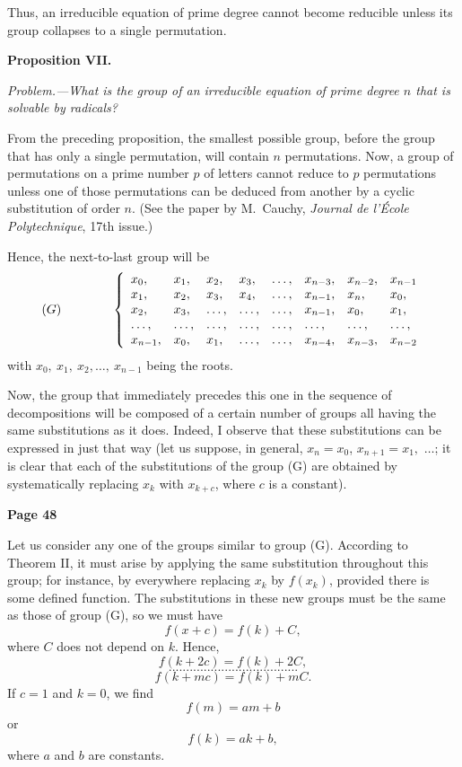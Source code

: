 \documentclass{article}
\begin{document}
Thus, an irreducible equation of prime degree cannot become reducible unless its group collapses to a single permutation.

\textbf{Proposition VII.}

\emph{Problem.---What is the group of an irreducible equation of prime degree $n$ that is solvable by radicals?}

From the preceding proposition, the smallest possible group, before the group that has only a single permutation, will contain $n$ permutations. Now, a group of permutations on a prime number $p$ of letters cannot reduce to $p$ permutations unless one of those permutations can be deduced from another by a cyclic substitution of order $n.$ (See the paper by M.\ Cauchy, \emph{Journal de l'École Polytechnique}, 17th issue.)

Hence, the next-to-last group will be
\[
(G)\quad\quad\quad\quad \left\{
\begin{array}{l l l l l l l l}
x_0, & x_1, & x_2, & x_3, & \dots, & x_{n-3}, & x_{n-2}, & x_{n-1} \\
x_1, & x_2, & x_3, & x_4, & \dots, & x_{n-1}, & x_n, & x_0, \\
x_2, & x_3, & \dots, &  \dots, &  \dots, & x_{n-1}, & x_0, & x_1, \\
\dots, & \dots, & \dots, & \dots, & \dots, & \dots, & \dots, & \dots, \\
x_{n-1}, & x_0, & x_{1}, & \dots, & \dots, & x_{n-4}, & x_{n-3}, & x_{n-2}
\end{array}
\right.
\]
with $x_0,\ x_1,\ x_2,\dots,\ x_{n-1}$ being the roots.

Now, the group that immediately precedes this one in the sequence of decompositions will be composed of a certain number of groups all having the same substitutions as it does. Indeed, I observe that these substitutions can be expressed in just that way (let us suppose, in general, $x_n=x_0$, $x_{n+1}=x_1,$ $\dots$; it is clear that each of the substitutions of the group (G) are obtained by systematically replacing $x_k$ with $x_{k + c}$, where $c$ is a constant).

\bigskip

\textbf{Page 48}

Let us consider any one of the groups similar to group (G). According to Theorem II, it must arise by applying the same substitution throughout this group; for instance, by everywhere replacing $x_k$ by $f(x_k)$, provided there is some defined function. The substitutions in these new groups must be the same as those of group (G), so we must have
\[
f(x + c) = f(k) + C,
\]
where $C$ does not depend on $k$. Hence,
\[
f(k + 2c) = f(k) + 2C,
\]
\[
.....................................
\]
\[
f(k + mc) = f(k) + mC.
\]
If $c=1$ and $k=0$, we find
\[
f(m) = am + b
\]
or
\[
f(k) = a k + b,
\]
where $a$ and $b$ are constants.
\end{document}
